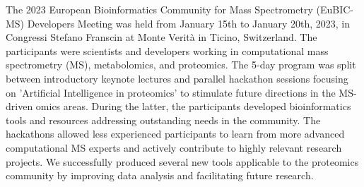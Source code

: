 The 2023 European Bioinformatics Community for Mass Spectrometry (EuBIC-MS) Developers Meeting was held from January 15th to January 20th, 2023, in Congressi Stefano Franscin at Monte Verità in Ticino, Switzerland. The participants were scientists and developers working in computational mass spectrometry (MS), metabolomics, and proteomics. The 5-day program was split between introductory keynote lectures and parallel hackathon sessions focusing on 'Artificial Intelligence in proteomics' to stimulate future directions in the MS-driven omics areas. During the latter, the participants developed bioinformatics tools and resources addressing outstanding needs in the community. The hackathons allowed less experienced participants to learn from more advanced computational MS experts and actively contribute to highly relevant research projects. We successfully produced several new tools applicable to the proteomics community by improving data analysis and facilitating future research.

